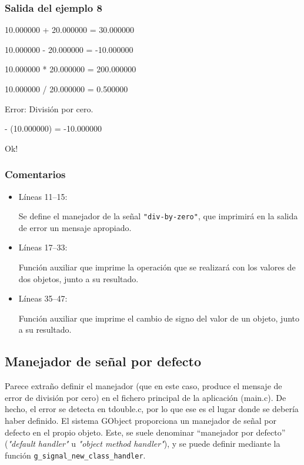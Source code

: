 \subsubsection{Salida del ejemplo 8}
10.000000 + 20.000000 = 30.000000\par
10.000000 - 20.000000 = -10.000000\par
10.000000 * 20.000000 = 200.000000\par
10.000000 / 20.000000 = 0.500000\par
\vspace{1ex}
Error: División por cero.\par
\vspace{1ex}
- (10.000000) = -10.000000\par
Ok!\par

\subsubsection{Comentarios}
\begin{itemize}
\item Líneas 11--15:\par
  Se define el manejador de la señal \texttt{"div-by-zero"}, que imprimirá en la salida
  de error un mensaje apropiado.
\item Líneas 17--33:\par
  Función auxiliar que imprime la operación que se realizará con los valores de dos
  objetos, junto a su resultado.
\item Líneas 35--47:\par
  Función auxiliar que imprime el cambio de signo del valor de un objeto, junto a su
  resultado.
\end{itemize}

\subsection{Manejador de señal por defecto}
Parece extraño definir el manejador (que en este caso, produce el mensaje de error de
división por cero) en el fichero principal de la aplicación (\textsf{main.c}). De hecho,
el error se detecta en \textsf{tdouble.c}, por lo que ese es el lugar donde se debería
haber definido. El sistema \textsf{GObject} proporciona un manejador de señal por
defecto en el propio objeto. Este, se suele denominar ``manejador por defecto''
(\emph{"default handler"} u \emph{"object method handler"}), y se puede definir mediante
la función \texttt{g\_signal\_new\_class\_handler}.

